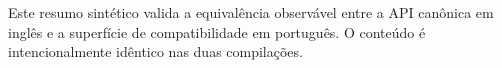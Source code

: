 Este resumo sintético valida a equivalência observável entre a API canônica em inglês e a superfície de compatibilidade em português. O conteúdo é intencionalmente idêntico nas duas compilações.

